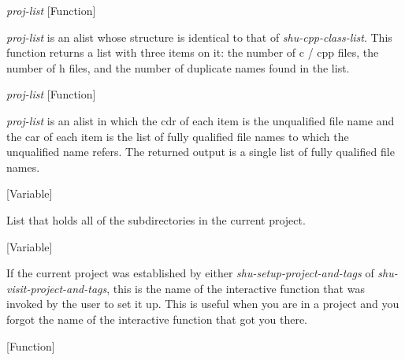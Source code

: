 \vspace{1em}
\noindent
{}
\usebox{\funcname}\emph{proj-list}
 \hfill [Function]

\begin{doc-string}
\emph{proj-list} is an alist whose structure is identical to that of \emph{shu-cpp-class-list}.
This function returns a list with three items on it: the number of c / cpp files, the
number of h files, and the number of duplicate names found in the list.
\end{doc-string}

\vspace{1em}
\noindent
{}
\usebox{\funcname}\emph{proj-list}
 \hfill [Function]

\begin{doc-string}
\emph{proj-list} is an alist in which the cdr of each item is the unqualified file name
and the car of each item is the list of fully qualified file names to which
the unqualified name refers.  The returned output is a single list of fully
qualified file names.
\end{doc-string}

\vspace{1em}
\noindent
{}
\usebox{\funcname}
 \hfill [Variable]

\begin{doc-string}
List that holds all of the subdirectories in the current project.
\end{doc-string}

\vspace{1em}
\noindent
{}
\usebox{\funcname}
 \hfill [Variable]

\begin{doc-string}
If the current project was established by either \emph{shu-setup-project-and-tags}
of \emph{shu-visit-project-and-tags}, this is the name of the interactive function that
was invoked by the user to set it up.  This is useful when you are in a project
and you forgot the name of the interactive function that got you there.
\end{doc-string}

\vspace{1em}
\noindent
{}
\usebox{\funcname}
 \hfill [Function]

